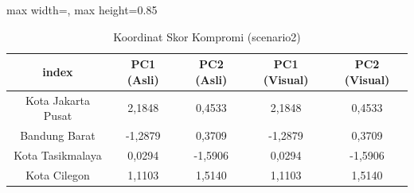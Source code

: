 \begin{table}[H]
\centering
\caption{Koordinat Skor Kompromi (scenario2)} \label{tab:sample2scores}
\begin{adjustbox}{max width=\textwidth, max height=0.85\textheight}
\begin{tabular}{|c|c|c|c|c|}
\hline
\textbf{index} & \textbf{PC1 (Asli)} & \textbf{PC2 (Asli)} & \textbf{PC1 (Visual)} & \textbf{PC2 (Visual)} \\
\hline
Kota Jakarta Pusat & 2,1848 & 0,4533 & 2,1848 & 0,4533 \\
Bandung Barat & -1,2879 & 0,3709 & -1,2879 & 0,3709 \\
Kota Tasikmalaya & 0,0294 & -1,5906 & 0,0294 & -1,5906 \\
Kota Cilegon & 1,1103 & 1,5140 & 1,1103 & 1,5140 \\
\hline
\end{tabular}
\end{adjustbox}
\end{table}